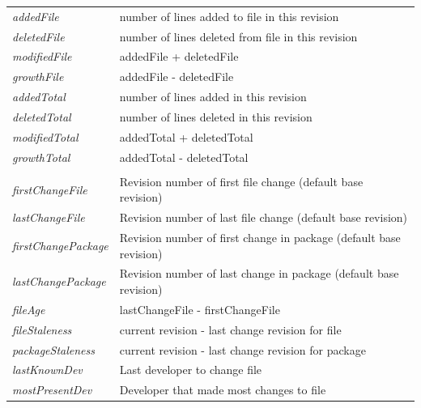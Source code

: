 \begin{table}[H]
\begin{tabular}{@{}ll@{}}
		\textit{addedFile}          & number of lines added to file in this revision                     \\
		\textit{deletedFile}        & number of lines deleted from file in this revision                 \\
		\textit{modifiedFile}       & addedFile + deletedFile                                            \\
		\textit{growthFile}         & addedFile - deletedFile                                            \\
		\textit{addedTotal}         & number of lines added in this revision                             \\
		\textit{deletedTotal}       & number of lines deleted in this revision                           \\
		\textit{modifiedTotal}      & addedTotal + deletedTotal                                          \\
		\textit{growthTotal}        & addedTotal - deletedTotal                                          \\
		\textit{}                   &                                                                    \\
		\textit{firstChangeFile}    & Revision number of first file change (default base revision)       \\
		\textit{lastChangeFile}     & Revision number of last file change (default base revision)        \\
		\textit{firstChangePackage} & Revision number of first change in package (default base revision) \\
		\textit{lastChangePackage}  & Revision number of last change in package (default base revision)  \\
		\textit{fileAge}            & lastChangeFile - firstChangeFile                                   \\
		\textit{fileStaleness}      & current revision - last change revision for file                   \\
		\textit{packageStaleness}   & current revision - last change revision for package                \\
		\textit{lastKnownDev}       & Last developer to change file                                      \\
		\textit{mostPresentDev}     & Developer that made most changes to file                           \\ \bottomrule
	\end{tabular}
\end{table}


